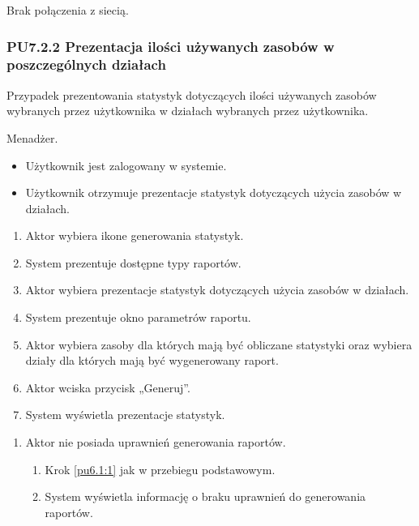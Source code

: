 Brak połączenia z siecią.

\subsubsection{PU7.2.2 Prezentacja ilości używanych zasobów w poszczególnych działach}
Przypadek prezentowania statystyk dotyczących ilości używanych zasobów wybranych przez użytkownika w działach wybranych przez użytkownika.

Menadżer.

\begin{itemize}
\item Użytkownik jest zalogowany w systemie.
\end{itemize}

\begin{itemize}
\item Użytkownik otrzymuje prezentacje statystyk dotyczących użycia zasobów w działach.
\end{itemize}

\begin{enumerate}
	\item \label{pu7.2.2:1} Aktor wybiera ikone generowania statystyk.
	\item System prezentuje dostępne typy raportów.
	\item \label{pu7.2.2:2} Aktor wybiera prezentacje statystyk dotyczących użycia zasobów w działach.
	\item System prezentuje okno parametrów raportu.
	\item Aktor wybiera zasoby dla których mają być obliczane statystyki oraz wybiera działy dla których mają być wygenerowany raport.
	\item Aktor wciska przycisk „Generuj”.
	\item System wyświetla prezentacje statystyk.
\end{enumerate}

\begin{enumerate}
	\item Aktor nie posiada uprawnień generowania raportów.
	\begin{enumerate}[label*=\arabic*.]
		\item Krok \ref{pu6.1:1} jak w przebiegu podstawowym.
		\item System wyświetla informację o braku uprawnień do generowania raportów.
	\end{enumerate}
\end{enumerate}

